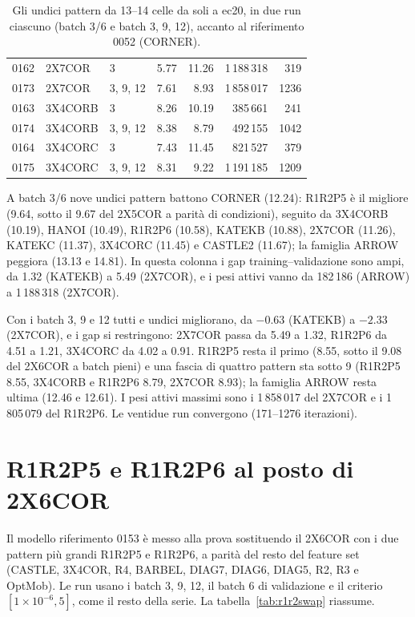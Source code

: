\begin{table}[ht]
\begin{tabular}{lllrrrr}
0162 & 2X7COR & 3 & 5.77 & 11.26 & 1\,188\,318 & 319 \\
0173 & 2X7COR & 3, 9, 12 & 7.61 & 8.93 & 1\,858\,017 & 1236 \\
0163 & 3X4CORB & 3 & 8.26 & 10.19 & 385\,661 & 241 \\
0174 & 3X4CORB & 3, 9, 12 & 8.38 & 8.79 & 492\,155 & 1042 \\
0164 & 3X4CORC & 3 & 7.43 & 11.45 & 821\,527 & 379 \\
0175 & 3X4CORC & 3, 9, 12 & 8.31 & 9.22 & 1\,191\,185 & 1209 \\
\bottomrule
\end{tabular}
\caption{Gli undici pattern da 13--14 celle da soli a ec20, in due
run ciascuno (batch 3/6 e batch 3, 9, 12), accanto al riferimento
0052 (CORNER).}
\label{tab:grandi}
\end{table}

A batch 3/6 nove undici pattern battono CORNER (12.24): R1R2P5 è
il migliore (9.64, sotto il 9.67 del 2X5COR a parità di
condizioni), seguito da 3X4CORB (10.19), HANOI (10.49), R1R2P6
(10.58), KATEKB (10.88), 2X7COR (11.26), KATEKC (11.37),
3X4CORC (11.45) e CASTLE2 (11.67); la famiglia ARROW peggiora
(13.13 e 14.81). In questa colonna i gap
training--validazione sono ampi, da 1.32 (KATEKB) a 5.49
(2X7COR), e i pesi attivi vanno da 182\,186 (ARROW) a
1\,188\,318 (2X7COR).

Con i batch 3, 9 e 12 tutti e undici migliorano, da $-0.63$
(KATEKB) a $-2.33$ (2X7COR), e i gap si restringono: 2X7COR
passa da 5.49 a 1.32, R1R2P6 da 4.51 a 1.21, 3X4CORC da 4.02 a
0.91. R1R2P5 resta il primo (8.55, sotto il 9.08 del 2X6COR a
batch pieni) e una fascia di quattro pattern sta sotto 9
(R1R2P5 8.55, 3X4CORB e R1R2P6 8.79, 2X7COR 8.93); la famiglia
ARROW resta ultima (12.46 e 12.61). I pesi attivi massimi sono
i 1\,858\,017 del 2X7COR e i 1\,805\,079 del R1R2P6. Le
ventidue run convergono (171--1276 iterazioni).

\section{R1R2P5 e R1R2P6 al posto di 2X6COR}
\label{sec:swap182}

Il modello riferimento 0153 è messo alla prova sostituendo il 2X6COR
con i due pattern più grandi R1R2P5 e R1R2P6, a parità del resto
del feature set (CASTLE, 3X4COR, R4, BARBEL, DIAG7, DIAG6,
DIAG5, R2, R3 e OptMob). Le run usano i batch 3, 9, 12, il batch
6 di validazione e il criterio $[1\times10^{-6}, 5]$, come il
resto della serie. La tabella~\ref{tab:r1r2swap} riassume.

